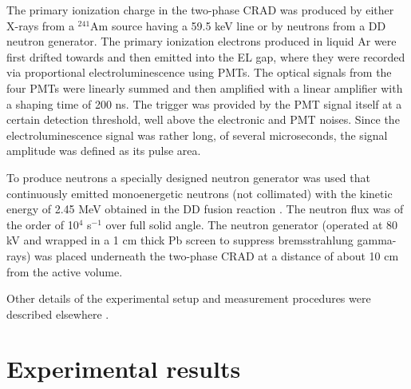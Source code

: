 \documentclass[a4paper,11pt]{article}
\begin{document}
The primary ionization charge in the two-phase CRAD was produced by either X-rays from a $^{241}$Am source having a 59.5 keV line or by neutrons from a DD neutron generator. The primary ionization electrons produced in liquid Ar were first drifted towards and then emitted into the EL gap, where they were recorded via proportional electroluminescence using PMTs. The optical signals from the four PMTs were linearly summed and then amplified with a linear amplifier with a shaping time of 200 ns. The trigger was provided by the PMT signal itself at a certain detection threshold, well above the electronic and PMT noises. Since the electroluminescence signal was rather long, of several microseconds, the signal amplitude was defined as its pulse area.

To produce neutrons a specially designed  neutron generator was used
that continuously emitted monoenergetic neutrons (not collimated)
with the kinetic energy of 2.45 MeV obtained in the DD fusion
reaction \cite{NScatProp, NGen, NGen16}. The neutron flux was of the order
of 10$^4$ s$^{-1}$ over full solid angle.  The neutron generator
(operated at 80 kV and wrapped in a 1 cm thick Pb screen to suppress
bremsstrahlung gamma-rays) was placed underneath the two-phase CRAD
at a distance of about 10 cm from the active volume.

Other details of the experimental setup and measurement procedures were described elsewhere \cite{IonYield14,CRADPropEL15,CRADELGap17}.

\section{Experimental results}
\end{document}
